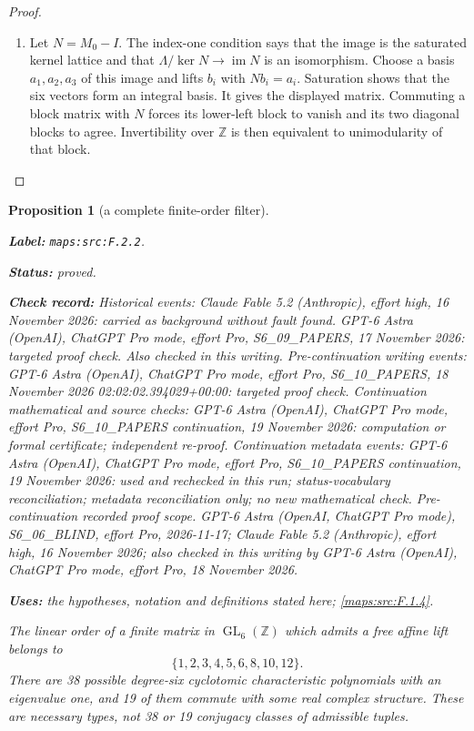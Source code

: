 \documentclass[11pt,a4paper]{article}
\newtheorem{proposition}[proposition]{Proposition}
\theoremstyle{definition}
\newcommand{\StatementRecord}[4]{\par\smallskip\begingroup\upshape\raggedright\noindent\textbf{Label:} \nolinkurl{#1}.\par\noindent\textbf{Status:} #2.\par\noindent\textbf{Check record:} #3.\par\noindent\textbf{Uses:} #4.\par\endgroup\smallskip}
\begin{document}
\begin{proof}
\begin{enumerate}[label=\arabic*.]
\item Let $N=M_0-I$.  The index-one condition says that the image
is the saturated kernel lattice and that
$\Lambda/\ker N\to\operatorname{im}N$ is an isomorphism.
Choose a basis $a_1,a_2,a_3$ of this image and lifts $b_i$ with
$Nb_i=a_i$.  Saturation shows that the six vectors form an
integral basis.  It gives the displayed matrix.  Commuting a
block matrix with $N$ forces its lower-left block to vanish
and its two diagonal blocks to agree.  Invertibility over
$\mathbb Z$ is then equivalent to unimodularity of that block.

\end{enumerate}
\end{proof}




\begin{proposition}[a complete finite-order filter]\label{maps:src:F.2.2}
\StatementRecord{maps:src:F.2.2}{proved}{Historical events: Claude Fable 5.2 (Anthropic), effort high, 16 November 2026: carried as background without fault found. GPT-6 Astra (OpenAI), ChatGPT Pro mode, effort Pro, S6\_09\_PAPERS, 17 November 2026: targeted proof check. Also checked in this writing. Pre-continuation writing events: GPT-6 Astra (OpenAI), ChatGPT Pro mode, effort Pro, S6\_10\_PAPERS, 18 November 2026 02:02:02.394029+00:00: targeted proof check. Continuation mathematical and source checks: GPT-6 Astra (OpenAI), ChatGPT Pro mode, effort Pro, S6\_10\_PAPERS continuation, 19 November 2026: computation or formal certificate; independent re-proof. Continuation metadata events: GPT-6 Astra (OpenAI), ChatGPT Pro mode, effort Pro, S6\_10\_PAPERS continuation, 19 November 2026: used and rechecked in this run; status-vocabulary reconciliation; metadata reconciliation only; no new mathematical check. \emph{Pre-continuation recorded proof scope.} GPT-6 Astra (OpenAI, ChatGPT Pro mode), S6\_06\_BLIND, effort Pro, 2026-11-17; Claude Fable 5.2 (Anthropic), effort high, 16 November 2026; also checked in this writing by GPT-6 Astra (OpenAI), ChatGPT Pro mode, effort Pro, 18 November 2026}{the hypotheses, notation and definitions stated here; \cref{maps:src:F.1.4}}


The linear order of a finite matrix in $\operatorname{GL}_6(\mathbb Z)$
which admits a free affine lift belongs to
\[
 \{1,2,3,4,5,6,8,10,12\}.
 \tag{F.3}\label{maps:eq:F.3}
\]
There are 38 possible degree-six cyclotomic characteristic
polynomials with an eigenvalue one, and 19 of them commute
with some real complex structure.  These are necessary types,
not 38 or 19 conjugacy classes of admissible tuples.

\end{proposition}
\end{document}
